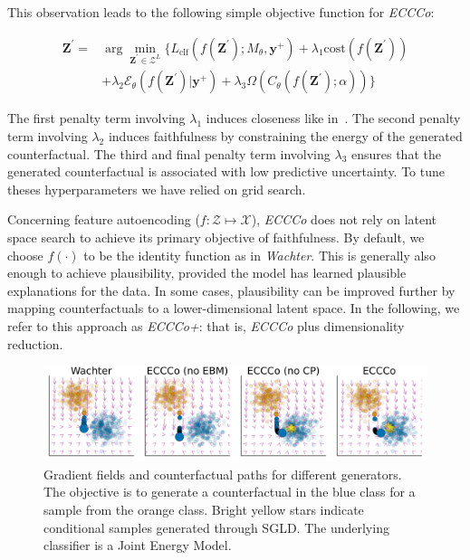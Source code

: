 \documentclass[letterpaper]{article} %
\begin{document}
This observation leads to the following simple objective function for \textit{ECCCo}:

\begin{equation} \label{eq:eccco}
  \begin{aligned}
  \mathbf{Z}^\prime =& \arg \min_{\mathbf{Z}^\prime \in \mathcal{Z}^L} \{  {L_{\text{clf}}(f(\mathbf{Z}^\prime);M_{\theta},\mathbf{y}^+)}+ \lambda_1 {\text{cost}(f(\mathbf{Z}^\prime)) } \\
  &+ \lambda_2 \mathcal{E}_{\theta}(f(\mathbf{Z}^\prime)|\mathbf{y}^+) + \lambda_3 \Omega(C_{\theta}(f(\mathbf{Z}^\prime);\alpha)) \} 
  \end{aligned} 
\end{equation}

The first penalty term involving $\lambda_1$ induces closeness like in~\citet{wachter2017counterfactual}. The second penalty term involving $\lambda_2$ induces faithfulness by constraining the energy of the generated counterfactual. The third and final penalty term involving $\lambda_3$ ensures that the generated counterfactual is associated with low predictive uncertainty. To tune theses hyperparameters we have relied on grid search.

Concerning feature autoencoding ($f: \mathcal{Z} \mapsto \mathcal{X}$), \textit{ECCCo} does not rely on latent space search to achieve its primary objective of faithfulness. By default, we choose $f(\cdot)$ to be the identity function as in \textit{Wachter}. This is generally also enough to achieve plausibility, provided the model has learned plausible explanations for the data. In some cases, plausibility can be improved further by mapping counterfactuals to a lower-dimensional latent space. In the following, we refer to this approach as \textit{ECCCo+}: that is, \textit{ECCCo} plus dimensionality reduction.

\begin{figure}
  \centering
  \includegraphics[width=0.75\linewidth]{figures/poc_gradient_fields.png}
  \caption{Gradient fields and counterfactual paths for different generators. The objective is to generate a counterfactual in the blue class for a sample from the orange class. Bright yellow stars indicate conditional samples generated through SGLD. The underlying classifier is a Joint Energy Model.}\label{fig:poc}
\end{figure}  
\end{document}
